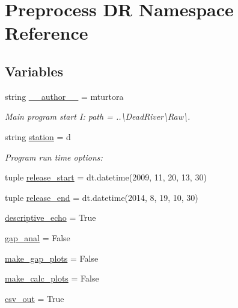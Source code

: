 \hypertarget{namespace_preprocess_01_d_r}{}\section{Preprocess D\+R Namespace Reference}
\label{namespace_preprocess_01_d_r}
\subsection*{Variables}
\begin{DoxyCompactItemize}
\item 
string \hyperlink{namespace_preprocess_01_d_r_a28ebd37638b2a3edddcef38b03de3d9e}{\+\_\+\+\_\+author\+\_\+\+\_\+} = \textquotesingle{}mturtora\textquotesingle{}
\begin{DoxyCompactList}\small\item\em Main program start I\+: path = \textquotesingle{}..\textbackslash{}Dead\+River\textbackslash{}Raw\textbackslash{}\textquotesingle{}. \end{DoxyCompactList}\item 
string \hyperlink{namespace_preprocess_01_d_r_aae6f3cd9de873f4f53dd09d43f047642}{station} = \textquotesingle{}d\textquotesingle{}
\begin{DoxyCompactList}\small\item\em Program run time options\+: \end{DoxyCompactList}\item 
tuple \hyperlink{namespace_preprocess_01_d_r_ae8d2848548745ca8cb3fff24f95b8265}{release\+\_\+start} = dt.\+datetime(2009, 11, 20, 13, 30)
\item 
tuple \hyperlink{namespace_preprocess_01_d_r_a7026d20c2cef287201c48fdf79c0e8f7}{release\+\_\+end} = dt.\+datetime(2014, 8, 19, 10, 30)
\item 
\hyperlink{namespace_preprocess_01_d_r_a6349ca51aac5eadefc205154d717c139}{descriptive\+\_\+echo} = True
\item 
\hyperlink{namespace_preprocess_01_d_r_ad7dfeae6dec3bc6a6c9446124ceafdc3}{gap\+\_\+anal} = False
\item 
\hyperlink{namespace_preprocess_01_d_r_ab7f2e80b89ea6ef3dd80564bcc64e272}{make\+\_\+gap\+\_\+plots} = False
\item 
\hyperlink{namespace_preprocess_01_d_r_aae343c994d5743a749e85f21f6ed62a2}{make\+\_\+calc\+\_\+plots} = False
\item 
\hyperlink{namespace_preprocess_01_d_r_a35685e7b260e2e5876d1b3b56f3e3677}{csv\+\_\+out} = True
\item 

\end{DoxyCompactItemize}
